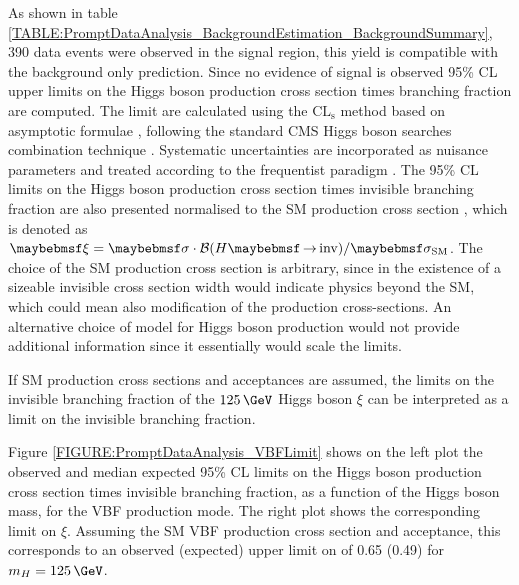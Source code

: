 
As shown in table \ref{TABLE:PromptDataAnalysis_BackgroundEstimation_BackgroundSummary}, 390 data events were observed in the signal region, this yield is compatible with the background only prediction. Since no evidence of signal is observed 95\% \gls{CL} upper limits on the Higgs boson production cross section times branching fraction are computed. The limit are calculated using the $\mathrm{CL}_\mathrm{s}$ method \cite{ARTICLE:HandbookofLHCHiggsCrossSectionsDifferentialDistributions,ARTICLE:CLsTechnique,ARTICLE:CLCompForCombiningSearchesWithSmallStat} based on asymptotic formulae \cite{ARTICLE:AsymptoticCLS}, following the standard \gls{CMS} Higgs boson searches combination technique \cite{ARTICLE:CMS_HiggsDiscovery,ARTICLE:HiggsCombination}. Systematic uncertainties are incorporated as nuisance parameters and treated according to the frequentist paradigm \cite{ARTICLE:HiggsCombination}. The 95\% \gls{CL} limits on the Higgs boson production cross section times invisible branching fraction are also presented normalised to the \gls{SM} production cross section \cite{ARTICLE:HandbookofLHCHiggsCrossSectionsInclusiveObservables,ARTICLE:HandbookofLHCHiggsCrossSectionsDifferentialDistributions}, which is denoted as $\xi = \sigma \cdot \BRinv / \sigma_\mathrm{SM}$. The choice of the \gls{SM} production cross section is arbitrary, since in the existence of a sizeable invisible cross section width would indicate physics beyond the \gls{SM}, which could mean also modification of the production cross-sections. An alternative choice of model for Higgs boson production would not provide additional information since it essentially would scale the limits.

If \gls{SM} production cross sections and acceptances are assumed, the limits on the invisible branching fraction of the $125\,\GeV$ Higgs boson $\xi$ can be interpreted as a limit on the invisible branching fraction.

Figure \ref{FIGURE:PromptDataAnalysis_VBFLimit} shows on the left plot the observed and median expected 95\% \gls{CL} limits on the Higgs boson production cross section times invisible branching fraction, as a function of the Higgs boson mass, for the \gls{VBF} production mode. The right plot shows the corresponding limit on $\xi$.  Assuming the \gls{SM} \gls{VBF} production cross section and acceptance, this corresponds to an observed (expected) upper limit on \BRinv of 0.65 (0.49) for $m_H=125\,\GeV$.

